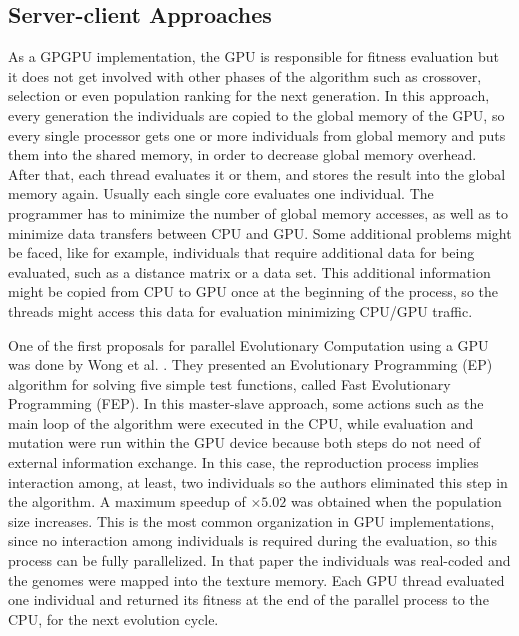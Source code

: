 \documentclass{article}
\begin{document}
\subsection{Server-client Approaches}
\label{sec:serverClient}

As a GPGPU implementation, the GPU is responsible for fitness
evaluation but it does not get involved with other phases of the
algorithm such as crossover, selection or even population ranking for
the next generation. In this approach, every generation the
individuals are copied to the global memory of the GPU, so every
single processor gets one or more individuals from global memory and
puts them into the shared memory, in order to decrease global memory
overhead. After that, each thread evaluates it or them, and stores the
result into the global memory again. Usually each single core
evaluates one individual. The programmer has to minimize the number of
global memory accesses, as well as to minimize data transfers between
CPU and GPU. Some additional problems might be faced, like for
example, individuals that require additional data for being evaluated,
such as a distance matrix or a data set. This additional information
might be copied from CPU to GPU once at the beginning of the process,
so the threads might access this data for evaluation minimizing CPU/GPU
traffic.

One of the first proposals for parallel Evolutionary Computation using
a GPU was done by Wong et
al. \cite{man-leung-wong-parallel-2005}. They presented an
Evolutionary Programming (EP) algorithm
for solving five simple test functions, called Fast Evolutionary Programming
(FEP). In this master-slave approach, some actions such as the main loop of the algorithm were executed in the CPU, while evaluation and mutation were run within the GPU device because both steps do not need of external information exchange. In this case, the reproduction process implies interaction among, at least, two individuals so the authors eliminated this step in the algorithm. A maximum speedup of $\times5.02$ was obtained when the population size increases. This is the most common organization in GPU implementations, since no
interaction among individuals is required during the evaluation, so
this process can be fully parallelized. In that paper the individuals
was real-coded and the genomes were mapped into the texture
memory. Each GPU thread evaluated one individual and returned its
fitness at the end of the parallel process to the CPU, for the next
evolution cycle.
\end{document}
